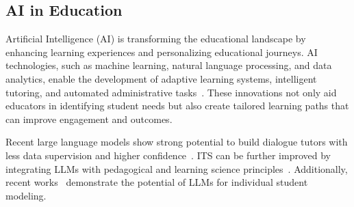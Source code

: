 

\subsection{AI in Education}
Artificial Intelligence (AI) is transforming the educational landscape by enhancing learning experiences and personalizing educational journeys. AI technologies, such as machine learning, natural language processing, and data analytics, enable the development of adaptive learning systems, intelligent tutoring, and automated administrative tasks~\cite{Mzwri}. These innovations not only aid educators in identifying student needs but also create tailored learning paths that can improve engagement and outcomes.

Recent large language models show strong potential to build dialogue tutors with less data supervision and higher confidence~\cite{related_work, conv_its3, mathdial}. ITS can be further improved by integrating LLMs with pedagogical and learning science principles~\cite{educhat,boo2dial,class_agent}. Additionally, recent works~\cite{chi, personalize} demonstrate the potential of LLMs for individual student modeling.